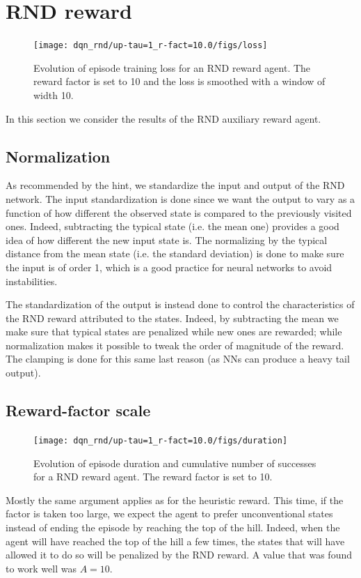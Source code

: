 \documentclass[a4paper, 12pt,oneside]{article}
\begin{document}
        \section{RND reward}
        \begin{figure}
            \centering
            \vspace{-2em}
            \texttt{[image: dqn\_rnd/up-tau=1\_r-fact=10.0/figs/loss]}
            \caption{Evolution of episode training loss for an RND reward agent. The reward factor is set to 10 and the loss is smoothed with a window of width 10.}
            \label{fig:dqn-rnd-r-fact=35-loss}
        \end{figure}
        In this section we consider the results of the RND auxiliary reward agent.
        \subsection{Normalization} 
        As recommended by the hint, we standardize the input and output of the RND network. The input standardization is done since we want the output to vary as a function of how different the observed state is compared to the previously visited ones. Indeed, subtracting the typical state (i.e. the mean one) provides a good idea of how different the new input state is.
        The normalizing by the typical distance from the mean state (i.e. the standard deviation) is done to make sure the input is of order 1, which is a good practice for neural networks to avoid instabilities.
        
        The standardization of the output is instead done to control the characteristics of the RND reward attributed to the states. Indeed, by subtracting the mean we make sure that typical states are penalized  while new ones are rewarded; while normalization makes it possible to tweak the order of magnitude of the reward. The clamping is done for this same last reason (as NNs can produce a heavy tail output). 
        \subsection{Reward-factor scale}
        \begin{figure}
            \centering
            \vspace{-2em}
            \texttt{[image: dqn\_rnd/up-tau=1\_r-fact=10.0/figs/duration]}
        \caption{Evolution of episode duration and cumulative number of successes for a RND reward agent. The reward factor is set to 10.}
        \label{fig:dqn-rnd-r-fact=35-duration}
        \end{figure}
        Mostly the same argument applies as for the heuristic reward. This time, if the factor is taken too large, we expect the agent to prefer unconventional states instead of ending the episode by reaching the top of the hill. Indeed, when the agent will have reached the top of the hill a few times, the states that will have allowed it to do so will be penalized by the RND reward. A value that was found to work well was $A=10$.
\end{document}
